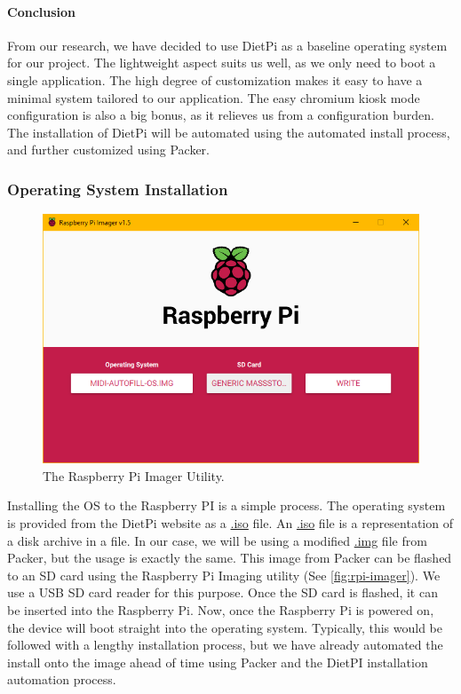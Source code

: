 \paragraph{Conclusion}

From our research, we have decided to use DietPi as a baseline operating system for our
project. The lightweight aspect suits us well, as we only need to boot a single
application. The high degree of customization makes it easy to have a minimal system
tailored to our application. The easy chromium kiosk mode configuration is also a big
bonus, as it relieves us from a configuration burden. The installation of DietPi will be
automated using the automated install process, and further customized using Packer.

\subsubsection{Operating System Installation}

\begin{figure}[h!]
  \centering
  \includegraphics[width=\linewidth]{image/rpi-imager.png}
  \caption{The Raspberry Pi Imager Utility.}
  \label{fig:rpi-imager}
\end{figure}

Installing the OS to the Raspberry PI is a simple process. The operating system is
provided from the DietPi website as a \url{.iso} file. An \url{.iso} file is a
representation of a disk archive in a file. In our case, we will be using a modified
\url{.img} file from Packer, but the usage is exactly the same. This image from Packer can
be flashed to an SD card using the Raspberry Pi Imaging utility (See
\autoref{fig:rpi-imager}). We use a USB SD card reader for this purpose. Once the SD card
is flashed, it can be inserted into the Raspberry Pi. Now, once the Raspberry Pi is
powered on, the device will boot straight into the operating system. Typically, this would
be followed with a lengthy installation process, but we have already automated the install
onto the image ahead of time using Packer and the DietPI installation automation process.

